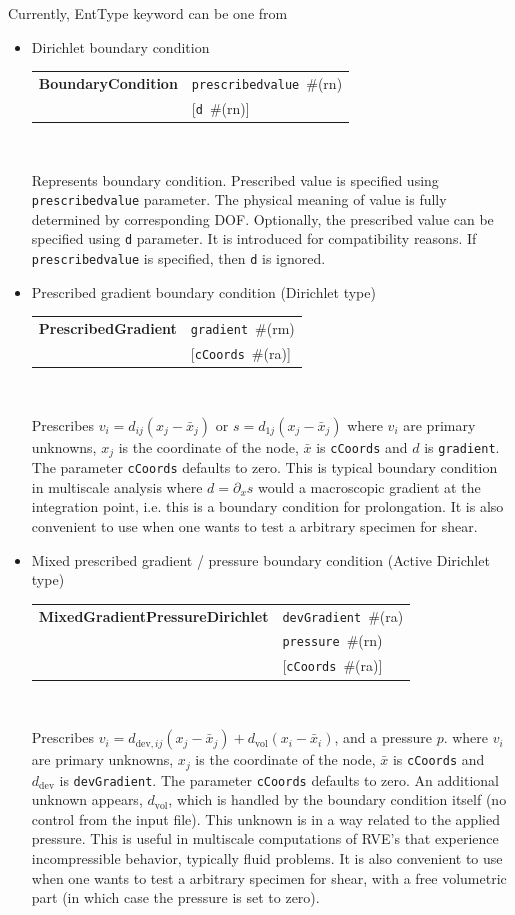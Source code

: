 \documentclass[a4paper]{article}
\makeatletter
\newcommand{\dev}{\mathrm{dev}}
\newcommand{\vol}{\mathrm{vol}}
\newcommand{\param}[1]{\texttt{#1}} %
\newcommand{\optional}[1]{[#1]} %
\newcommand{\field}[2]{\param{#1}~\#{\tiny(#2)}} %
\newcommand{\optField}[2]{\optional{\field{#1}{#2}}}
\newcommand{\entKeywordInst}[1]{\textbf{#1}} %
\newenvironment{record}[1][]{\begin{tabular}{|ll}}{\end{tabular}\\}
\newcommand{\recentry}[2]{{#1}&{#2}\\}
\newcounter{rcc}
\newenvironment{record}[1][\textwidth]{\setcounter{rcc}{0}\begin{tabular*}{#1}{|ll@{\extracolsep{\fill}}r}}{\end{tabular*}\\}
\newcommand{\recentry}[2]{\ifthenelse{\value{rcc}>0}{&$\backslash$ \\}{\setcounter{rcc}{1}}{#1}&{#2}}
\makeatother
\begin{document}
Currently, EntType keyword can be one from
\begin{itemize}
\item Dirichlet boundary condition

\noindent
\begin{record}[0.9\textwidth]
  \recentry{\entKeywordInst{BoundaryCondition}}{\field{prescribedvalue}{rn}}
  \recentry{}{\optField{d}{rn}}
\end{record}

Represents boundary condition.
Prescribed value is specified using \param{prescribedvalue} parameter.
The physical meaning of value is fully determined by corresponding DOF.
Optionally, the prescribed value can be specified using \param{d}
parameter. It is introduced for compatibility reasons. If
\param{prescribedvalue} is specified, then \param{d} is ignored.

\item Prescribed gradient boundary condition (Dirichlet type)

\begin{record}[0.9\textwidth]
  \recentry{\entKeywordInst{PrescribedGradient}}{\field{gradient}{rm}}
  \recentry{}{\optField{cCoords}{ra}}
\end{record}

Prescribes $ v_i = d_{ij}(x_j-\bar{x}_j) $ or $ s = d_{1j}(x_j - \bar{x}_j) $
where $ v_i $ are primary unknowns, $x_j$ is the coordinate of the node, $\bar x$ is \param{cCoords} and $d$ is \param{gradient}.
The parameter \param{cCoords} defaults to zero.
This is typical boundary condition in multiscale analysis where $ d = \partial_x s$
would a macroscopic gradient at the integration point, i.e. this is a boundary condition for prolongation.
It is also convenient to use when one wants to test a arbitrary specimen for shear. 

\item Mixed prescribed gradient / pressure boundary condition (Active Dirichlet type)

\begin{record}[0.9\textwidth]
  \recentry{\entKeywordInst{MixedGradientPressureDirichlet}}{\field{devGradient}{ra}}
  \recentry{}{\field{pressure}{rn}}
  \recentry{}{\optField{cCoords}{ra}}
\end{record}

Prescribes $ v_i = d_{\dev,ij}(x_j-\bar{x}_j) + d_\vol(x_i-\bar{x}_i)$, and a pressure $p$.
where $ v_i $ are primary unknowns, $x_j$ is the coordinate of the node, $\bar x$ is \param{cCoords} and $d_\dev$ is \param{devGradient}.
The parameter \param{cCoords} defaults to zero.
An additional unknown appears, $d_\vol$, which is handled by the boundary condition itself (no control from the input file).
This unknown is in a way related to the applied pressure.
This is useful in multiscale computations of RVE's that experience incompressible behavior, typically fluid problems. 
It is also convenient to use when one wants to test a arbitrary specimen for shear, with a free volumetric part (in which case the pressure is set to zero).


\end{itemize}
\end{document}
